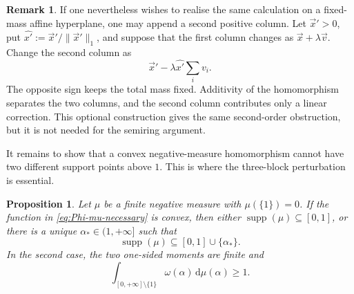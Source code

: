 \documentclass[aps,pra,11pt,onecolumn,nofootinbib,tightenlines]{revtex4-2}
\newtheorem{proposition}[theorem]{Proposition}
\theoremstyle{definition}
\newtheorem{remark}[theorem]{Remark}
\begin{document}
\begin{remark}
\label{rem:trace-preserving-witnesses}
If one nevertheless wishes to realise the same calculation on a fixed-mass
affine hyperplane, one may append a second positive column.  Let
$\vec x'>0$, put $\widehat{x'}:=\vec x'/\|\vec x'\|_1$, and suppose that the
first column changes as $\vec x+\lambda\vec v$.  Change the second column as
\begin{equation}
 \vec x'-\lambda\widehat{x'}\sum_i v_i.
 \label{eq:compensated-second-column}
\end{equation}
The opposite sign keeps the total mass fixed.  Additivity of the homomorphism
separates the two columns, and the second column contributes only a linear
correction.  This optional construction gives the same second-order
obstruction, but it is not needed for the semiring argument.
\end{remark}

It remains to show that a convex negative-measure homomorphism cannot have two different support points above $1$. This is where the three-block perturbation is essential.

\begin{proposition}
\label{prop:negative-single-point}
Let $\mu$ be a finite negative measure with $\mu(\{1\})=0$. If the function
in \eqref{eq:Phi-mu-necessary} is convex, then either
$\operatorname{supp}(\mu)\subseteq[0,1]$, or there is a unique
$\alpha_*\in(1,+\infty]$ such that
\begin{equation}
 \operatorname{supp}(\mu)\subseteq[0,1]\cup\{\alpha_*\}.
 \label{eq:support-above-one-set}
\end{equation}
In the second case, the two one-sided moments are finite and
\begin{equation}
 \int_{[0,+\infty]\setminus\{1\}}
 \omega(\alpha)\,\mathrm d\mu(\alpha)\geq1.
 \label{eq:negative-single-point-statement-moment}
\end{equation}
\end{proposition}
\end{document}
